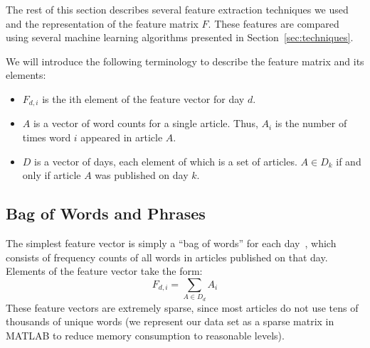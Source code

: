 \documentclass[10pt, twocolumn]{article}
\begin{document}
The rest of this section describes several feature extraction techniques we used and the representation of the feature matrix $F$.  These features are compared using several machine learning algorithms presented in Section~\ref{sec:techniques}.

We will introduce the following terminology to describe the feature matrix and its elements:

\begin{itemize}


\item $F_{d,i}$ is the ith element of the feature vector for day $d$.


\item $A$ is a vector of word counts for a single article. Thus, $A_i$ is the number of times word $i$ appeared in article $A$.

\item $D$ is a vector of days, each element of which is a set of articles. $A \in D_k$ if and only if article $A$ was published on day $k$.


\end{itemize}

\subsection{Bag of Words and Phrases}
\label{sec:bagsofwords}

The simplest feature vector is simply a ``bag of words'' for each day~\cite{featurehash}, which consists of frequency counts of all words in articles published on that day. Elements of the feature vector take the form: $$\displaystyle F_{d,i} = \sum_{A \in D_d}{A_i}$$ These feature vectors are extremely sparse, since most articles do not use tens of thousands of unique words (we represent our data set as a sparse matrix
in MATLAB to reduce memory consumption to reasonable levels).
\end{document}
